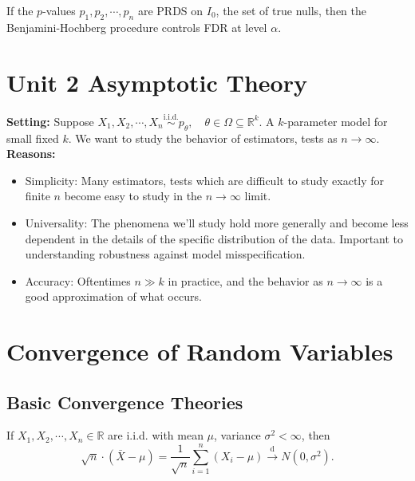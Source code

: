 \documentclass[a4paper]{article}
\begin{document}
\begin{thm}
	If the $p$-values $p_1,p_2,\cdots,p_n$ are PRDS on $I_0$, the set of true nulls, then the Benjamini-Hochberg procedure controls FDR at level $\alpha$.
\end{thm}

\section*{Unit 2 Asymptotic Theory}

\textbf{Setting:} Suppose $X_1,X_2,\cdots,X_n \stackrel{\text{i.i.d.}}{\sim} p_{\theta}, \quad \theta \in \Omega \subseteq \mathbb{R}^k$. A $k$-parameter model for small fixed $k$. We want to study the behavior of estimators, tests as $n \to \infty$.\\
\newline
\noindent \textbf{Reasons:} \quad
\begin{itemize}
	\item Simplicity: Many estimators, tests which are difficult to study exactly for finite $n$ become easy to study in the $n \to \infty$ limit.
	\item Universality: The phenomena we'll study hold more generally and become less dependent in the details of the specific distribution of the data. Important to understanding robustness against model misspecification.
	\item Accuracy: Oftentimes $n \gg k$ in practice, and the behavior as $n \to \infty$ is a good approximation of what occurs.
\end{itemize}

\section{Convergence of Random Variables}

\subsection{Basic Convergence Theories}

\begin{thm}
	If $X_1,X_2,\cdots,X_n \in \mathbb{R}$ are i.i.d. with mean $\mu$, variance $\sigma^2 < \infty$, then
	\begin{equation}
		\sqrt{n} \cdot (\bar{X} -\mu) = \frac{1}{\sqrt{n}} \sum\limits_{i=1}^n(X_i - \mu) \stackrel{\text{d}}{\longrightarrow} N(0,\sigma^2).
	\end{equation}
\end{thm}
\end{document}
